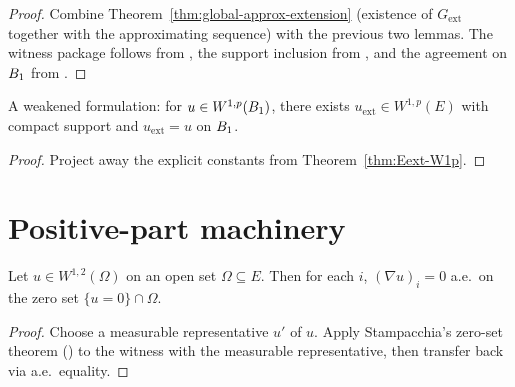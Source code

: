 \begin{proof}
\leanok
{}

Combine Theorem~\ref{thm:global-approx-extension} (existence of
$G_{\mathrm{ext}}$ together with the approximating sequence) with the previous
two lemmas. The witness package follows from
, the support inclusion from
, and the agreement on $B_{1}$
from .
\end{proof}

\begin{theorem}
\label{thm:exists_unitBall_W1p_extension}
\leanok
{}
A weakened formulation: for $u \in W^{1,p}(B_{1})$, there exists $u_{\mathrm{ext}}
\in W^{1,p}(E)$ with compact support and $u_{\mathrm{ext}} = u$ on $B_{1}$.
\end{theorem}

\begin{proof}
\leanok
{}

Project away the explicit constants from Theorem~\ref{thm:Eext-W1p}.
\end{proof}

\section{Positive-part machinery}

\begin{theorem}
\label{thm:MemW1pWitness_weakGrad_ae_eq_zero_on_zeroSet}
\leanok
{}
Let $u \in W^{1,2}(\Omega)$ on an open set $\Omega \subseteq E$. Then for
each $i$, $(\nabla u)_i = 0$ a.e.\ on the zero set $\{u = 0\}\cap \Omega$.
\end{theorem}

\begin{proof}
\leanok
{}

Choose a measurable representative $u'$ of $u$. Apply Stampacchia's zero-set
theorem () to the witness with
the measurable representative, then transfer back via a.e.\ equality.
\end{proof}

